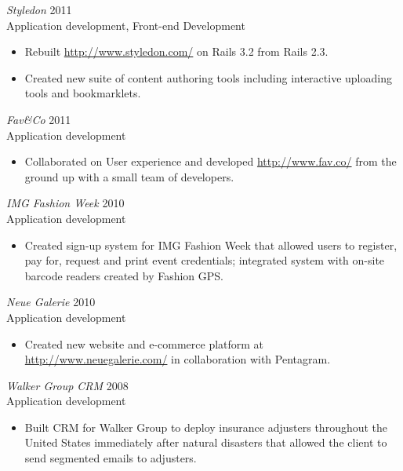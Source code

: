 \documentclass[line,margin]{res}
\begin{document}
\begin{resume}
\begin{samepage}
\begin{itemize}
    \end{itemize}
    \end{samepage}

    {\sl Styledon}
    \hfill 2011 \\
    Application development, Front-end Development
    \begin{itemize} \itemsep -2pt
        \item
            Rebuilt \url{http://www.styledon.com/} on Rails 3.2 from Rails
            2.3.

        \item
            Created new suite of content authoring tools including interactive
            uploading tools and bookmarklets.

    \end{itemize}

    {\sl Fav\&Co}
    \hfill 2011 \\
    Application development
    \begin{itemize} \itemsep -2pt
        \item
            Collaborated on User experience and developed
            \url{http://www.fav.co/} from the ground up with a small team of
            developers.

    \end{itemize}

    {\sl IMG Fashion Week}
    \hfill 2010 \\
    Application development
    \begin{itemize} \itemsep -2pt
        \item
            Created sign-up system for IMG Fashion Week that allowed users to
            register, pay for, request and print event credentials; integrated
            system with on-site barcode readers created by Fashion GPS.

    \end{itemize}

    {\sl Neue Galerie}
    \hfill 2010 \\
    Application development
    \begin{itemize} \itemsep -2pt
        \item
            Created new website and e-commerce platform at
            \mbox{\url{http://www.neuegalerie.com/}} in collaboration with
            Pentagram.

    \end{itemize}

    \begin{samepage}
    {\sl Walker Group CRM}
    \hfill 2008 \\
    Application development
    \begin{itemize} \itemsep -2pt
        \item
            Built CRM for Walker Group to deploy insurance adjusters
            throughout the United States immediately after natural disasters
            that allowed the client to send segmented emails to adjusters.


\end{itemize}
\end{samepage}
\end{resume}
\end{document}
